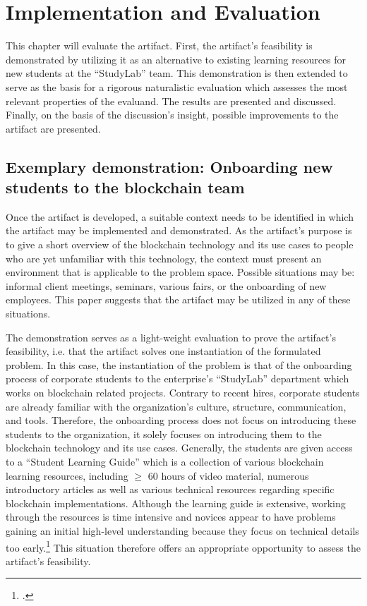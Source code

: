 \chapter{Implementation and Evaluation}

This chapter will evaluate the artifact. First, the artifact's feasibility is demonstrated by utilizing it as an alternative to existing learning resources for new students at the \enquote{StudyLab} team. This demonstration is then extended to serve as the basis for a rigorous naturalistic evaluation which assesses the most relevant properties of the evaluand. The results are presented and discussed. Finally, on the basis of the discussion's insight, possible improvements to the artifact are presented.

\section{Exemplary demonstration: Onboarding new students to the blockchain team} \label{sec:demo}

Once the artifact is developed, a suitable context needs to be identified in which the artifact may be implemented and demonstrated. As the artifact's purpose is to give a short overview of the blockchain technology and its use cases to people who are yet unfamiliar with this technology, the context must present an environment that is applicable to the problem space. Possible situations may be: informal client meetings, seminars, various fairs, or the onboarding of new employees. This paper suggests that the artifact may be utilized in any of these situations.

The demonstration serves as a light-weight evaluation to prove the artifact's feasibility, i.e. that the artifact solves one instantiation of the formulated problem. In this case, the instantiation of the problem is that of the onboarding process of corporate students to the enterprise's \enquote{StudyLab} department which works on blockchain related projects. Contrary to recent hires, corporate students are already familiar with the organization's culture, structure, communication, and tools. Therefore, the onboarding process does not focus on introducing these students to the organization, it solely focuses on introducing them to the blockchain technology and its use cases. Generally, the students are given access to a \enquote{Student Learning Guide} which is a collection of various blockchain learning resources, including $\geq$ 60 hours of video material, numerous introductory articles as well as various technical resources regarding specific blockchain implementations. Although the learning guide is extensive, working through the resources is time intensive and novices appear to have problems gaining an initial high-level understanding because they focus on technical details too early.\footcites[Cf.][]{RalphB_Interview} This situation therefore offers an appropriate opportunity to assess the artifact's feasibility.

